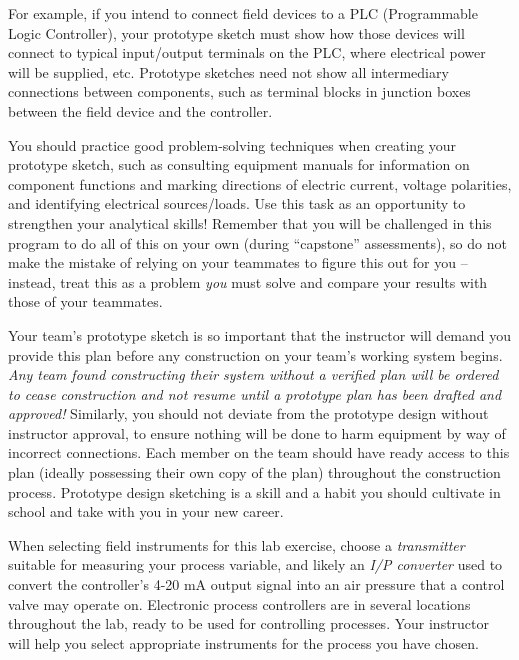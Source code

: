 For example, if you intend to connect field devices to a PLC (Programmable Logic Controller), your prototype sketch must show how those devices will connect to typical input/output terminals on the PLC, where electrical power will be supplied, etc.  Prototype sketches need not show all intermediary connections between components, such as terminal blocks in junction boxes between the field device and the controller.

You should practice good problem-solving techniques when creating your prototype sketch, such as consulting equipment manuals for information on component functions and marking directions of electric current, voltage polarities, and identifying electrical sources/loads.  Use this task as an opportunity to strengthen your analytical skills!  Remember that you will be challenged in this program to do all of this on your own (during ``capstone'' assessments), so do not make the mistake of relying on your teammates to figure this out for you -- instead, treat this as a problem {\it you} must solve and compare your results with those of your teammates.

Your team's prototype sketch is so important that the instructor will demand you provide this plan before any construction on your team's working system begins.  {\it Any team found constructing their system without a verified plan will be ordered to cease construction and not resume until a prototype plan has been drafted and approved!}  Similarly, you should not deviate from the prototype design without instructor approval, to ensure nothing will be done to harm equipment by way of incorrect connections.  Each member on the team should have ready access to this plan (ideally possessing their own copy of the plan) throughout the construction process.  Prototype design sketching is a skill and a habit you should cultivate in school and take with you in your new career.

\vskip 10pt

When selecting field instruments for this lab exercise, choose a {\it transmitter} suitable for measuring your process variable, and likely an {\it I/P converter} used to convert the controller's 4-20 mA output signal into an air pressure that a control valve may operate on.  Electronic process controllers are in several locations throughout the lab, ready to be used for controlling processes.  Your instructor will help you select appropriate instruments for the process you have chosen.

